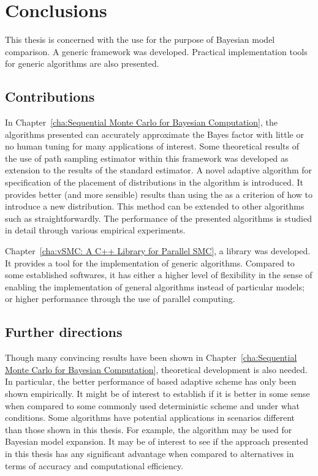 \chapter{Conclusions}
\label{cha:Conclusions}

This thesis is concerned with the use \smc for the purpose of Bayesian model
comparison. A generic framework was developed. Practical implementation tools
for generic \smc algorithms are also presented.

\section{Contributions}
\label{sec:Contributions}

In Chapter~\ref{cha:Sequential Monte Carlo for Bayesian Computation}, the
algorithms presented can accurately approximate the Bayes factor with little
or no human tuning for many applications of interest. Some theoretical results
of the use of path sampling estimator within this framework was developed as
extension to the results of the standard estimator. A novel adaptive algorithm
for specification of the placement of distributions in the \smc[2] algorithm
is introduced. It provides better (and more sensible) results than using the
\ess as a criterion of how to introduce a new distribution. This method can be
extended to other algorithms such as \smc[3] straightforwardly. The
performance of the presented algorithms is studied in detail through various
empirical experiments.

Chapter~\ref{cha:vSMC: A C++ Library for Parallel SMC}, a \cpp library was
developed. It provides a tool for the implementation of generic \smc
algorithms. Compared to some established softwares, it has either a higher
level of flexibility in the sense of enabling the implementation of general
algorithms instead of particular models; or higher performance through the use
of parallel computing.

\section{Further directions}
\label{sec:Further directions}


Though many convincing results have been shown in Chapter~\ref{cha:Sequential
  Monte Carlo for Bayesian Computation}, theoretical development is also
needed. In particular, the better performance of \cess based adaptive scheme
has only been shown empirically. It might be of interest to establish if it is
better in some sense when compared to some commonly used deterministic
scheme and under what conditions. Some algorithms have potential applications
in scenarios different than those shown in this thesis. For example, the
\smc[3] algorithm may be used for Bayesian model expansion. It may be of
interest to see if the approach presented in this thesis has any significant
advantage when compared to alternatives in terms of accuracy and computational
efficiency.

